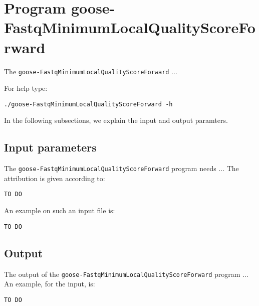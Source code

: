 \section{Program goose-FastqMinimumLocalQualityScoreForward}
The \texttt{goose-FastqMinimumLocalQualityScoreForward} ...

For help type:
\begin{lstlisting}
./goose-FastqMinimumLocalQualityScoreForward -h
\end{lstlisting}
In the following subsections, we explain the input and output paramters.

\subsection*{Input parameters}

The \texttt{goose-FastqMinimumLocalQualityScoreForward} program needs ...
The attribution is given according to:
\begin{lstlisting}
TO DO
\end{lstlisting}

An example on such an input file is:
\begin{lstlisting}
TO DO
\end{lstlisting}

\subsection*{Output}
The output of the \texttt{goose-FastqMinimumLocalQualityScoreForward} program ...
An example, for the input, is:
\begin{lstlisting}
TO DO
\end{lstlisting}
